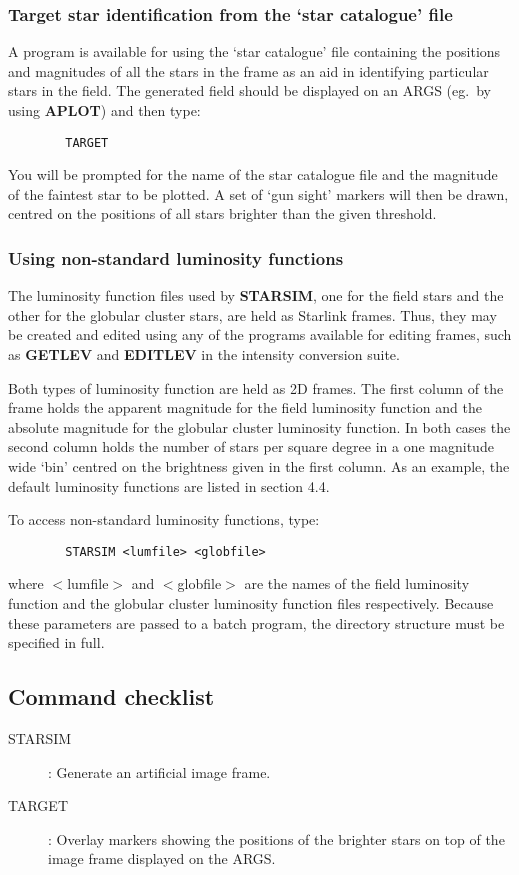 \subsubsection {Target star identification from the `star catalogue' file}
A program is available for using the `star catalogue' file containing the
positions and magnitudes of all the stars in the frame as an aid in identifying
particular stars in the field.
The generated field should be displayed on an ARGS (eg.\ by using {\bf APLOT})
and then type:
\begin{verbatim}
        TARGET
\end{verbatim}
You will be prompted for the name of the star catalogue file and the magnitude
of the faintest star to be plotted.
A set of `gun sight' markers will then be drawn, centred on the positions of all
stars brighter than the given threshold.
\subsubsection {Using non-standard luminosity functions}
The luminosity function files used by {\bf STARSIM}, one for the field stars and
the other for the globular cluster stars, are held as Starlink frames.
Thus, they may be created and edited using any of the programs available for
editing frames, such as {\bf GETLEV} and {\bf EDITLEV} in the intensity
conversion suite.

Both types of luminosity function are held as 2D frames.
The first column of the frame holds the apparent magnitude for the field
luminosity function and the absolute magnitude for the globular cluster
luminosity function.
In both cases the second column holds the number of stars per square degree in
a one magnitude wide `bin' centred on the brightness given in the first column.
As an example, the default luminosity functions are listed in section 4.4.

To access non-standard luminosity functions, type:
\begin{verbatim}
        STARSIM <lumfile> <globfile>
\end{verbatim}
where $<$lumfile$>$ and $<$globfile$>$ are the names of the field luminosity function
and the globular cluster luminosity function files respectively.
Because these parameters are passed to a batch program, the directory structure
must be specified in full.
\subsection {Command checklist}
\begin{description}
\item [STARSIM]: Generate an artificial image frame.
\item [TARGET]: Overlay markers showing the positions of the brighter stars on
top of the image frame displayed on the ARGS.
\end{description}
